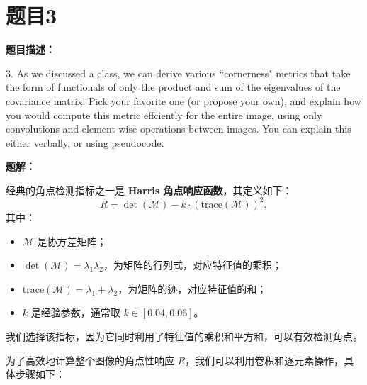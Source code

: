 \documentclass[UTF8]{ctexart}
\begin{document}
		
	\section{题目3}
	\textbf{题目描述：}
	
	 3. As we discussed a class, we can derive various “cornerness" metrics that take the form
	of functionals of only the product and sum of the eigenvalues of the covariance matrix.
	Pick your favorite one (or propose your own), and explain how you would compute
	this metric effciently for the entire image, using only convolutions and element-wise
	operations between images. You can explain this either verbally, or using pseudocode.
	
	
	\textbf{题解：}
	
	经典的角点检测指标之一是 \textbf{Harris 角点响应函数}，其定义如下：
	\[
	R = \det(\mathcal{M}) - k \cdot (\text{trace}(\mathcal{M}))^2,
	\]
	其中：
	\begin{itemize}
		\item \(\mathcal{M}\) 是协方差矩阵；
		\item \(\det(\mathcal{M}) = \lambda_1 \lambda_2\)，为矩阵的行列式，对应特征值的乘积；
		\item \(\text{trace}(\mathcal{M}) = \lambda_1 + \lambda_2\)，为矩阵的迹，对应特征值的和；
		\item \(k\) 是经验参数，通常取 \(k \in [0.04, 0.06]\)。
	\end{itemize}
	
	我们选择该指标，因为它同时利用了特征值的乘积和平方和，可以有效检测角点。
	
	为了高效地计算整个图像的角点性响应 \(R\)，我们可以利用卷积和逐元素操作，具体步骤如下：
	
\end{document}
